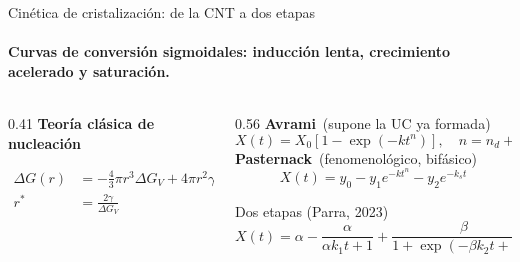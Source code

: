 \documentclass[aspectratio=169,11pt]{beamer}
\begin{document}
\begin{frame}{Cinética de cristalización: de la CNT a dos etapas}
  \framesubtitle{Curvas de conversión sigmoidales: inducción lenta, crecimiento acelerado y saturación.}
  \begin{columns}[c,onlytextwidth]
    \begin{column}{0.41\textwidth}
      \centering
      {\color{azul}\bfseries\small Teoría clásica de nucleación}\\[0.2em]
      \small
      \begin{align}
        \Delta G(r) &= -\tfrac{4}{3}\pi r^{3}\Delta G_V + 4\pi r^{2}\gamma \tag{3}\\
        r^{*} &= \frac{2\gamma}{\Delta G_V} \tag{4}
      \end{align}
    \end{column}
    \begin{column}{0.56\textwidth}
      \small
      {\color{azul}\bfseries Avrami}\ {\footnotesize (supone la UC ya formada)}
      \begin{equation}
        X(t) = X_0\left[1-\exp\!\left(-kt^{n}\right)\right],\quad n=n_d+n_N \tag{5}
      \end{equation}
      {\color{azul}\bfseries Pasternack}\ {\footnotesize (fenomenológico, bifásico)}
      \begin{equation}
        X(t) = y_0 - y_1 e^{-kt^{n}} - y_2 e^{-k_s t} \tag{6}
      \end{equation}
      \vspace{-0.6em}
      \begin{block}{Dos etapas (Parra, 2023)}
        \vspace{-0.4em}
        \begin{equation}
          X(t) = \alpha - \frac{\alpha}{\alpha k_1 t + 1} + \frac{\beta}{1+\exp\!\left(-\beta k_2 t + D\right)} \tag{7}
        \end{equation}
      \end{block}
    \end{column}
  \end{columns}
\end{frame}
\end{document}
